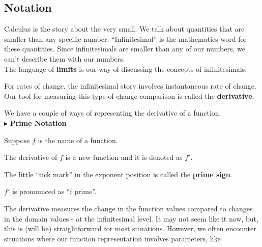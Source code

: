 \documentclass{ximera}
\begin{document}
\subsection*{Notation}











Calculus is the story about the very small.  We talk about quantities that are smaller than any specific number.  ``Infinitesimal'' is the mathematics word for these quantities. Since infinitesimals are smaller than any of our numbers, we can't describe them with our numbers.  \\

The language of \textbf{limits} is our way of discussing the concepts of infinitesimals.  


For rates of change, the infinitesimal story involves instantaneous rate of change.  Our tool for measuring this type of change comparison is called the \textbf{derivative}.

We have a couple of ways of representing the derivative of a function. \\


$\blacktriangleright$  \textbf{\textcolor{purple!85!blue}{Prime Notation}}


Suppose $f$ is the name of a function.

The derivative of $f$ is a new function and it is denoted as \textbf{\textcolor{purple!85!blue}{$f'$}}.

The little ``tick mark'' in the exponent position is called the \textbf{\textcolor{purple!85!blue}{prime sign}}.


$f'$ is pronounced as ``f prime''.


The derivative measures the change in the function values compared to changes in the domain values - at the infinitesimal level. It may not seem like it now, but, this is (will be) straightforward for most situations.  However, we often encounter situations where our function representation involves parameters, like
\end{document}
